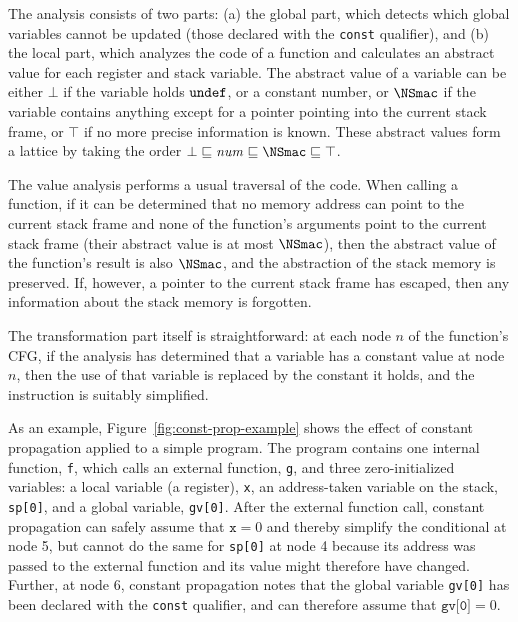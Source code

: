 The analysis consists of two parts: 
(a) the global part, which detects which global variables cannot be updated (\ie those declared with the \texttt{const} qualifier), and
(b) the local part, which analyzes the code of a function and calculates an abstract value for each register and stack variable.
The abstract value of a variable can be either $\bot$ if the variable holds $\tt undef$, 
or a constant number, 
or $\NSmac$ if the variable contains anything except for a pointer pointing into the current stack frame, 
or $\top$ if no more precise information is known.
These abstract values form a lattice by taking the order $\bot \sqsubseteq \mathit{num} \sqsubseteq \NSmac \sqsubseteq \top$.


The value analysis performs a usual traversal of the code. 
When calling a function, 
if it can be determined that no memory address can point to the current stack frame 
and none of the function's arguments point to the current stack frame (\ie their abstract value is at most $\NSmac$), 
then the abstract value of the function's result is also $\NSmac$, and the abstraction of the stack memory is preserved.
If, however, a pointer to the current stack frame has escaped, then any information about the stack memory is forgotten.

The transformation part itself is straightforward: 
at each node $n$ of the function's CFG, if the analysis has determined that a variable has a constant value at node $n$,
then the use of that variable is replaced by the constant it holds, and the instruction is suitably simplified.

As an example, 
Figure~\ref{fig:const-prop-example} shows the effect of constant propagation applied to a simple program.
The program contains one internal function, \texttt{f}, which calls an external function, \texttt{g},
and three zero-initialized variables: 
a local variable (a register), \texttt{x}, 
an address-taken variable on the stack, \texttt{sp[0]},
and a global variable, \texttt{gv[0]}.
After the external function call, 
constant propagation can safely assume that $\texttt{x}=0$ and thereby simplify the conditional at node 5,
but cannot do the same for \texttt{sp[0]} at node 4
because its address was passed to the external function and its value might therefore have changed.
Further, at node 6, 
constant propagation notes that the global variable \texttt{gv[0]} has been declared with the \texttt{const} qualifier,
and can therefore assume that $\texttt{gv[0]}=0$.


% 

